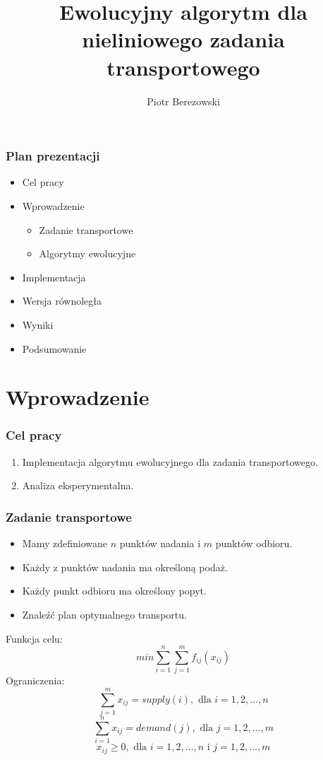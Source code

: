 \documentclass{beamer}
\title{Ewolucyjny algorytm dla nieliniowego zadania transportowego}
\institute{Wydział Podstawowych Problemów Techniki}
\author{Piotr Berezowski}
\begin{document}
\begin{frame}
\frametitle{Plan prezentacji}
\begin{itemize}
\item Cel pracy
\item Wprowadzenie
    \begin{itemize}
    \item Zadanie transportowe
    \item Algorytmy ewolucyjne
    \end{itemize}
\item Implementacja
\item Wersja równoległa    
\item Wyniki
\item Podsumowanie
\end{itemize}
\end{frame}

\section{Wprowadzenie}

\begin{frame}
\frametitle{Cel pracy}
\begin{enumerate}
    \item Implementacja algorytmu ewolucyjnego dla zadania transportowego.
    \item Analiza eksperymentalna.
\end{enumerate}
\end{frame}

\begin{frame}
\frametitle{Zadanie transportowe}
 {
    \begin{itemize}
        \item Mamy zdefiniowane $n$ punktów nadania i $m$ punktów odbioru.
        \item Każdy z punktów nadania ma określoną podaż.
        \item Każdy punkt odbioru ma określony popyt.
        \item Znaleźć plan optymalnego transportu.
    \end{itemize}
}
 {
    Funkcja celu:
    $$min \sum_{i=1}^{n} \sum_{j=1}^{m} f_{ij}(x_{ij})$$
    Ograniczenia:
    $$\sum_{j=1}^{m} x_{ij} = supply(i), \text{ dla } i = 1, 2, \dots, n$$
    $$\sum_{i=1}^{n} x_{ij} = demand(j), \text{ dla } j = 1, 2, \dots, m$$
    $$x_{ij} \ge 0, \text{ dla } i = 1, 2, \dots, n \text{ i } j = 1, 2, \dots, m$$
}
\end{frame}
\end{document}
